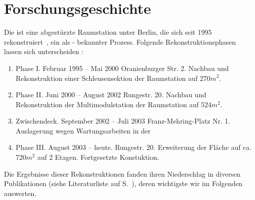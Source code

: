 \section*{Forschungsgeschichte}

    Die  ist eine abgestürzte Raumstation unter Berlin, die sich seit 1995 rekonstruiert~\cite{cbasebook}, ein als  -  bekannter Prozess. Folgende Rekonstruktionsphasen lassen sich unterscheiden \cite{cbasepressemap} \cite{cbasebook}:
    \begin{enumerate}
        \item Phase I.  Februar 1995 -- Mai 2000 Oranienburger Str. 2.  Nachbau und Rekonstruktion einer Schleusensektion der  Raumstation auf 270$m^2$.  \cite{cbasepressemap} \cite{cbasebook} 
        \item Phase II.   Juni 2000 -- August 2002 Rungestr. 20.  Nachbau und Rekonstruktion der Multimodulstation  der  Raumstation auf 524$m^2$.  \cite{cbasepressemap} \cite{cbasebook} 
        \item Zwischendeck.  September 2002 -- Juli 2003 Franz-Mehring-Platz Nr. 1. 
        Auslagerung wegen Wartungsarbeiten in der ~\cite{cbasepressemap}~\cite{cbasebook} 
        \item Phase III.  August 2003 -- heute. Rungestr. 20. 
         Erweiterung der Fläche auf ca. 720$m^2$ auf 2 Etagen. Fortgesetzte Konstuktion.
    \end{enumerate}

Die Ergebnisse dieser Rekonstruktionen fanden ihren Niederschlag in diversen Publikationen (siehe Literaturliste auf S.~\pageref{sec:literatur}), deren wichtigste wir im Folgenden auswerten. 
